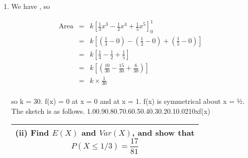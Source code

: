 \documentclass[a4paper,30pt]{article}
\begin{document}
\begin{enumerate}
\item We have , so 


\begin{eqnarray*}
\mbox{Area} 
&=& k \left[ \frac{1}{3}x^3 - \frac{1}{2}x^4 + \frac{1}{5}x^5 \right]^{1}_{0}\\
&=& k \left[  \left( \frac{1}{3} - 0 \right)  -  \left(\frac{1}{2} - 0 \right) +  \left( \frac{1}{5} - 0 \right) \right]\\
&=& k \left[  \frac{1}{3} - \frac{1}{2} + \frac{1}{5} \right]\\
&=& k \left[  \left(\frac{10}{30} - \frac{15}{30} + \frac{6}{30}\right)\right]\\
&=& k \times \frac{1}{30} \\
\end{eqnarray*}


so k = 30.
f(x) = 0 at x = 0 and at x = 1. f(x) is symmetrical about x = ½. The sketch is as follows. 1.00.90.80.70.60.50.40.30.20.10.0210xf(x)

    \begin{table}[ht!]
     \centering
     \begin{tabular}{|p{15cm}|}
     \hline        
\noindent (ii) Find $E(X)$ and $Var(X)$, and show that \[  P(X \leq 1/3 ) = \frac{17}{81} \]

\\ \hline
      \end{tabular}
    \end{table}


\end{enumerate}
\end{document}
